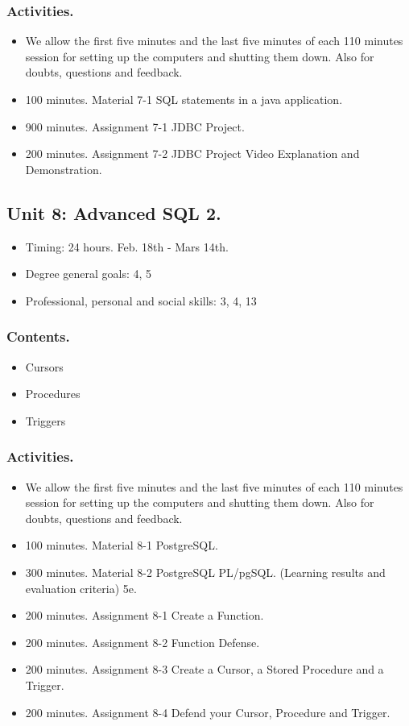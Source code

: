 \documentclass[catalan, a4paper, 12pt, titlepage]{article}
\begin{document}
  \subsubsection{Activities.}
  \begin{itemize}
          \item We allow the first five minutes and the last five minutes of each 110 minutes session for setting up the computers and shutting them down. Also for doubts, questions and feedback.
	  \item 100 minutes. Material 7-1 SQL statements in a java application.
	  \item 900 minutes. Assignment 7-1 JDBC Project.
	  \item 200 minutes. Assignment 7-2 JDBC Project Video Explanation and Demonstration.
  \end{itemize}

  \subsection{Unit 8: Advanced SQL 2.}

  \begin{itemize}
	\item Timing: 24 hours. Feb. 18th - Mars 14th.
	\item Degree general goals: 4, 5
	\item Professional, personal and social skills: 3, 4, 13
  \end{itemize}

  \subsubsection{Contents.}
  \begin{itemize}
	  \item Cursors
	  \item Procedures
	  \item Triggers
  \end{itemize}

  \subsubsection{Activities.}
  \begin{itemize}
          \item We allow the first five minutes and the last five minutes of each 110 minutes session for setting up the computers and shutting them down. Also for doubts, questions and feedback.
	  \item 100 minutes. Material 8-1 PostgreSQL.
	  \item 300 minutes. Material 8-2 PostgreSQL PL/pgSQL. (\faGraduationCap Learning results and evaluation criteria) 5e.
	  \item 200 minutes. Assignment 8-1 Create a Function.
	  \item 200 minutes. Assignment 8-2 Function Defense.
	  \item 200 minutes. Assignment 8-3 Create a Cursor, a Stored Procedure and a Trigger.
	  \item 200 minutes. Assignment 8-4 Defend your Cursor, Procedure and Trigger.
  \end{itemize}
\end{document}
